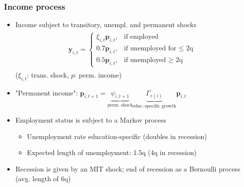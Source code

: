 \documentclass[pdflatex,aspectratio=169]{beamer}
\begin{document}
    \begin{frame}
      \frametitle{ Income process}

      \begin{itemize}[<+->]

      \item Income subject to transitory, unempl. and permanent shocks
        \begin{equation}\begin{gathered}\begin{aligned}
          \mathbf{y}_{i,t} =   \begin{cases}
            \xi_{i,t}\mathbf{p}_{i,t}, & \text{if employed} \\
            0.7 \mathbf{p}_{i,t}, & \text{if unemployed for $\leq$ 2q} \\
            0.5 \mathbf{p}_{i,t}, & \text{if unemployed $\ge$ 2q} 
          \end{cases}
        \end{aligned}\end{gathered}\end{equation}
        ($\xi_{i,t}$: trans.
shock, $p$: perm.
income)
        
      \item "Permanent income":  $\mathbf{p}_{i,t+1} = \underbrace{\psi_{i,t+1}}_{\text{perm.
shock}} \underbrace{\Gamma_{e(i)}}_{\text{educ.-specific growth}}\mathbf{p}_{i,t}$ 


        \pause
        \bigskip
      \item Employment status is subject to a Markov process
        \begin{itemize}[<+->]
        \item Unemployment rate education-specific (doubles in recession)
        \item Expected length of unemployment: 1.5q  (4q in recession)
        \end{itemize}
        
      \item Recession is given by an MIT shock; end of recession as a Bernoulli process (avg.
length of 6q)
        
        
      \end{itemize}

    \end{frame}
\end{document}
